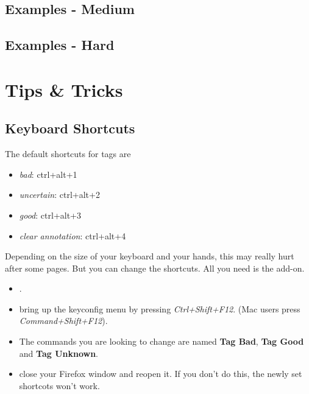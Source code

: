 \documentclass[12pt]{article}
\begin{document}
\subsection{Examples - Medium}






\subsection{Examples - Hard}
% 


\section{Tips \& Tricks}
\label{TnT}
\subsection{Keyboard Shortcuts}
The default shortcuts for tags are \\
\begin{itemize}
	\item \emph{bad}: ctrl+alt+1
	\item \emph{uncertain}: ctrl+alt+2
	\item \emph{good}: ctrl+alt+3
	\item \emph{clear annotation}: ctrl+alt+4
\end{itemize}

Depending on the size of your keyboard and your hands, this may really hurt after some pages. But you can change the shortcuts. All you need is the  add-on.

\begin{itemize}
	\item {}.
	\item bring up the keyconfig menu by pressing \emph{Ctrl+Shift+F12}. (Mac users press \emph{Command+Shift+F12}).
	\item The commands you are looking to change are named \textbf{Tag Bad}, \textbf{Tag Good} and \textbf{Tag Unknown}.
	\item close your Firefox window and reopen it. If you don't do this, the newly set shortcots won't work.
\end{itemize}
\end{document}
